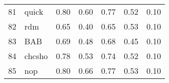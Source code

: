 \documentclass[12pt]{article}
\begin{document}
\begin{footnotesize}
\begin{longtable}{rl|c|c|c|c|c}
				81                   & quick                       & 0.80                             & 0.60                                                                                          & 0.77                                                                                          & 0.52                                                                                          & 0.10                                                                                                   \\
				82                   & rdm                         & 0.65                             & 0.40                                                                                          & 0.65                                                                                          & 0.53                                                                                          & 0.10                                                                                                   \\
				83                   & BAB                         & 0.69                             & 0.48                                                                                          & 0.68                                                                                          & 0.45                                                                                          & 0.10                                                                                                   \\
				84                   & chcsho                      & 0.78                             & 0.53                                                                                          & 0.74                                                                                          & 0.52                                                                                          & 0.10                                                                                                   \\
				85                   & nop                         & 0.80                             & 0.66                                                                                          & 0.77                                                                                          & 0.53                                                                                          & 0.10                                                                                                   \\

\end{longtable}
\end{footnotesize}
\end{document}
